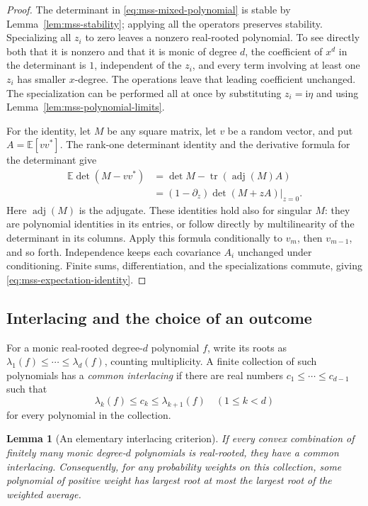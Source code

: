 \documentclass[11pt]{amsart}
\newtheorem{lemma}[theorem]{Lemma}
\theoremstyle{definition}
\theoremstyle{remark}
\numberwithin{equation}{section}
\begin{document}
\begin{proof}
The determinant in \eqref{eq:mss-mixed-polynomial} is stable by
Lemma~\ref{lem:mss-stability}; applying all the operators preserves
stability.  Specializing all $z_i$ to zero leaves a nonzero real-rooted
polynomial.  To see directly both that it is nonzero and that it is
monic of degree $d$, the coefficient of $x^d$ in the determinant is
$1$, independent of the $z_i$, and every term involving at least one
$z_i$ has smaller $x$-degree.  The operations leave that leading
coefficient unchanged.  The specialization can be performed all at
once by substituting $z_i=\mathrm i\eta$ and using
Lemma~\ref{lem:mss-polynomial-limits}.

For the identity, let $M$ be any square matrix, let $v$ be a random
vector, and put $A=\mathbb E[vv^*]$.  The rank-one determinant identity
and the derivative formula for the determinant give
\begin{align*}
 \mathbb E\det(M-vv^*)
 &=\det M-\operatorname{tr}(\operatorname{adj}(M)A)\\
 &=\left.(1-\partial_z)\det(M+zA)\right|_{z=0}.
\end{align*}
Here $\operatorname{adj}(M)$ is the adjugate.  These identities hold
also for singular $M$: they are polynomial identities in its entries,
or follow directly by multilinearity of the determinant in its
columns.  Apply this formula conditionally to $v_m$, then $v_{m-1}$,
and so forth.  Independence keeps each covariance $A_i$ unchanged
under conditioning.  Finite sums, differentiation, and the
specializations commute, giving
\eqref{eq:mss-expectation-identity}.
\end{proof}

\subsection{Interlacing and the choice of an outcome}

For a monic real-rooted degree-$d$ polynomial $f$, write its roots as
$\lambda_1(f)\leq\cdots\leq\lambda_d(f)$, counting multiplicity.
A finite collection of such polynomials has a \emph{common
interlacing} if there are real numbers
$c_1\leq\cdots\leq c_{d-1}$ such that
\[
 \lambda_k(f)\leq c_k\leq\lambda_{k+1}(f)
 \quad(1\leq k<d)
\]
for every polynomial in the collection.

\begin{lemma}[An elementary interlacing criterion]
\label{lem:mss-common-interlacing}
If every convex combination of finitely many monic degree-$d$
polynomials is real-rooted, they have a common interlacing.
Consequently, for any probability weights on this collection, some
polynomial of positive weight has largest root at most the largest
root of the weighted average.
\end{lemma}
\end{document}
